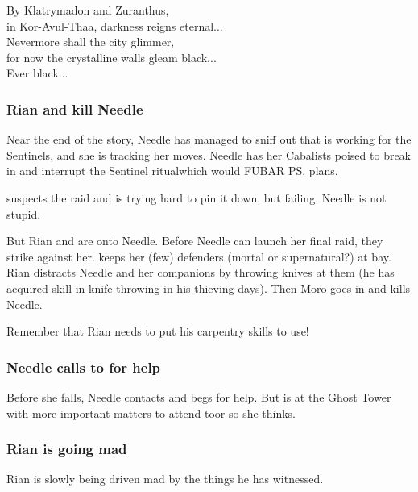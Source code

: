 \begin{garbage}
{  By Klatrymadon and Zuranthus, \\
  in Kor-Avul-Thaa, darkness reigns eternal...\\
  Nevermore shall the city glimmer, \\
  for now the crystalline walls gleam black...\\
  Ever black...
}





\subsubsection{Rian and \Cornel{} kill Needle}
Near the end of the story, Needle has managed to sniff out that \Tiroco{} is working for the Sentinels, and she is tracking her moves. 
Needle has her Cabalists poised to break in and interrupt the Sentinel ritual\dash which would FUBAR \ps{\Secherdamon} plans. 

\Psyrex{} suspects the raid and is trying hard to pin it down, but failing. 
Needle is not stupid. 

But Rian and \Cornel{} are onto Needle. 
Before Needle can launch her final raid, they strike against her. 
\Cornel{} keeps her (few) defenders (mortal or supernatural?) at bay. 
Rian distracts Needle and her companions by throwing knives at them (he has acquired skill in knife-throwing in his thieving days). 
Then Moro goes in and kills Needle. 

Remember that Rian needs to put his carpentry skills to use! 





\subsubsection{Needle calls to \Achsah{} for help}
Before she falls, Needle contacts \Achsah{} and begs for help. 
But \Achsah{} is at the Ghost Tower with more important matters to attend to\dash or so she thinks. 





\subsubsection{Rian is going mad}
Rian is slowly being driven mad by the things he has witnessed. 

\end{garbage}
